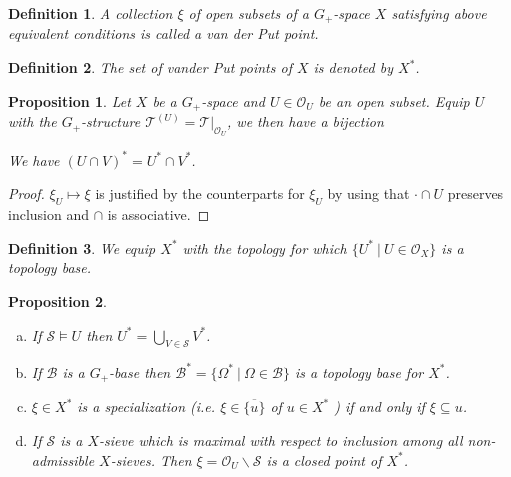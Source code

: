 \documentclass[8pt]{article}
\numberwithin{equation}{section}
\newtheorem{proposition}{Proposition}[subsection]
\newtheorem{definition}{Definition}[subsection]
\newtheorem{remark}{Remark}[subsection]
\newcommand{\Ouv}{\mathscr{O}}
\newcommand{\sep}[0]{\:|\:}
\newcommand{\sS}[0]{\mathscr{S}}
\newcommand{\cB}[0]{\mathcal{B}}
\begin{document}
\begin{definition}
    \label{definition_9_9}
    A collection $\xi$ of open subsets of a $G_+$-space $X$ satisfying above equivalent conditions is called a van der Put point.
\end{definition}
\begin{definition}
    \label{definition_9_10}
    The set of vander Put points of $X$ is denoted by $X^*$.
\end{definition}
\begin{proposition}
    \label{fact_9_2}
    Let $X$ be a $G_+$-space and $U\in\Ouv_U$ be an open subset. Equip $U$ with the $G_+$-structure $\mathcal{T}^{(U)}=\mathcal{T}|_{\Ouv_U}$, we then have a bijection
    \begin{center}
    \end{center}
    We have $(U\cap V)^*=U^*\cap V^*$.
\end{proposition}
\begin{proof}
    $\xi_U\mapsto\xi$ is justified by the counterparts for $\xi_U$ by using that $\cdot\cap U$ preserves inclusion and $\cap$ is associative.
\end{proof}
\begin{definition}
    \label{definition_9_11}
    We equip $X^*$ with the topology for which $\{U^*\sep U\in\Ouv_X\}$ is a topology base.
\end{definition}
\begin{proposition}$\:$
    \label{fact_9_3}
    \begin{enumerate}[a.]
        \item If $\sS\vDash U$ then $U^*=\bigcup_{V\in\sS}V^*$. %
        \item If $\cB$ is a $G_+$-base then $\cB^*=\{\Omega^*\sep \Omega\in\cB\}$ is a topology base for $X^*$. %
        \item $\xi\in X^*$ is a specialization (i.e. $\xi\in\overline{\{u\}}$ of $u\in X^*$ ) if and only if $\xi\subseteq u$.
        \item If $\sS$ is a $X$-sieve which is maximal with respect to inclusion among all non-admissible $X$-sieves. Then $\xi=\Ouv_U\backslash\sS$ is a closed point of $X^*$.
    \end{enumerate}
\end{proposition}
\end{document}

